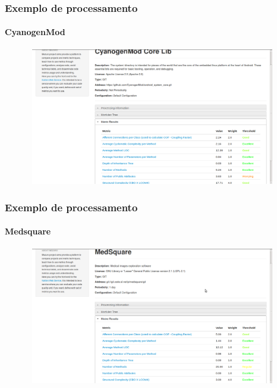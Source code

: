 \documentclass{beamer}
\begin{document}
        \begin{frame}
      \frametitle{Exemplo de processamento}
      \framesubtitle{CyanogenMod}
      
      \begin{figure}
        \begin{center}
          \includegraphics[width=11cm, height=6cm]{images/cyano.png}
          \label{fig:home}
        \end{center}
      \end{figure}
    
    \end{frame}
    
     \begin{frame}
      \frametitle{Exemplo de processamento}
      \framesubtitle{Medsquare}
      
      \begin{figure}
        \begin{center}
          \includegraphics[width=11cm, height=6cm]{images/med.png}
          \label{fig:home}
        \end{center}
      \end{figure}
    
    \end{frame}
\end{document}

